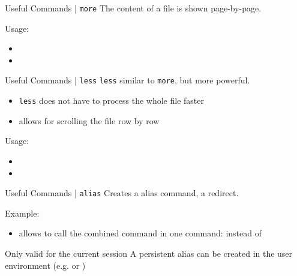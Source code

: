 \documentclass{setbeamer}
\begin{document}
\begin{frame}{Useful Commands | \texttt{more}}
   The content of a file is shown page-by-page.

    \vspace{0.3cm}

    Usage:
    \begin{itemize}
        \item {}
        \item {}
    \end{itemize}
\end{frame}

\begin{frame}{Useful Commands | \texttt{less}}
    \texttt{less} similar to \texttt{more}, but more powerful.
    \begin{itemize}
        \item \texttt{less} does not have to process the whole file {\Large \MVRightarrow} faster
        \item allows for scrolling the file row by row
    \end{itemize}

    \vspace{0.3cm}

    Usage:
    \begin{itemize}
        \item {}
        \item {}
    \end{itemize}
\end{frame}

\begin{frame}{Useful Commands | \texttt{alias}}
    Creates a alias command, a redirect.

    \vspace{0.3cm}

    Example:
    \begin{itemize}
        \item {}\textemdash allows to call the combined command in one command:  instead of 
    \end{itemize}

    \vspace{0.3cm}
    Only valid for the current session
    {\Large \MVRightarrow} A persistent alias can be created in the user environment (e.g.  or )
\end{frame}
\end{document}
